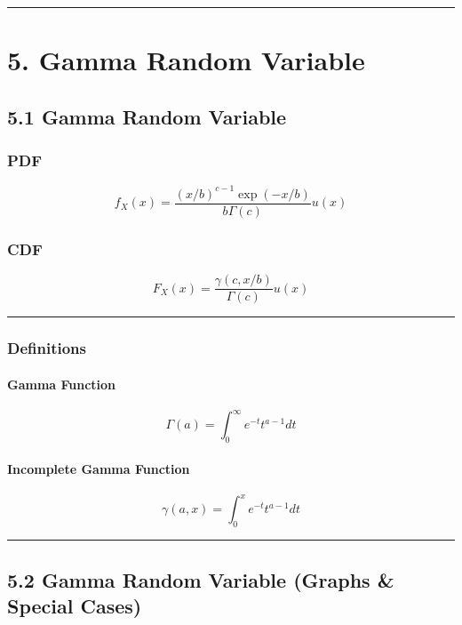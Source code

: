 \documentclass[12pt]{article}
\begin{document}
\hrule
\vspace{1em}

\section*{\textbf{5. Gamma Random Variable}}

\subsection*{\textbf{5.1 Gamma Random Variable}}

\subsubsection*{\textbf{PDF}}

\[
f_X(x)=\frac{(x/b)^{c-1}\exp(-x/b)}{b\Gamma(c)}u(x)
\]

\subsubsection*{\textbf{CDF}}

\[
F_X(x)=\frac{\gamma(c,x/b)}{\Gamma(c)}u(x)
\]

\hrule
\vspace{1em}

\subsubsection*{\textbf{Definitions}}

\paragraph{\textbf{Gamma Function}}

\[
\Gamma(a)=\int_0^\infty e^{-t}t^{a-1}dt
\]

\paragraph{\textbf{Incomplete Gamma Function}}

\[
\gamma(a,x)=\int_0^x e^{-t}t^{a-1}dt
\]

\hrule
\vspace{1em}

\subsection*{\textbf{5.2 Gamma Random Variable (Graphs \& Special Cases)}}
\end{document}
